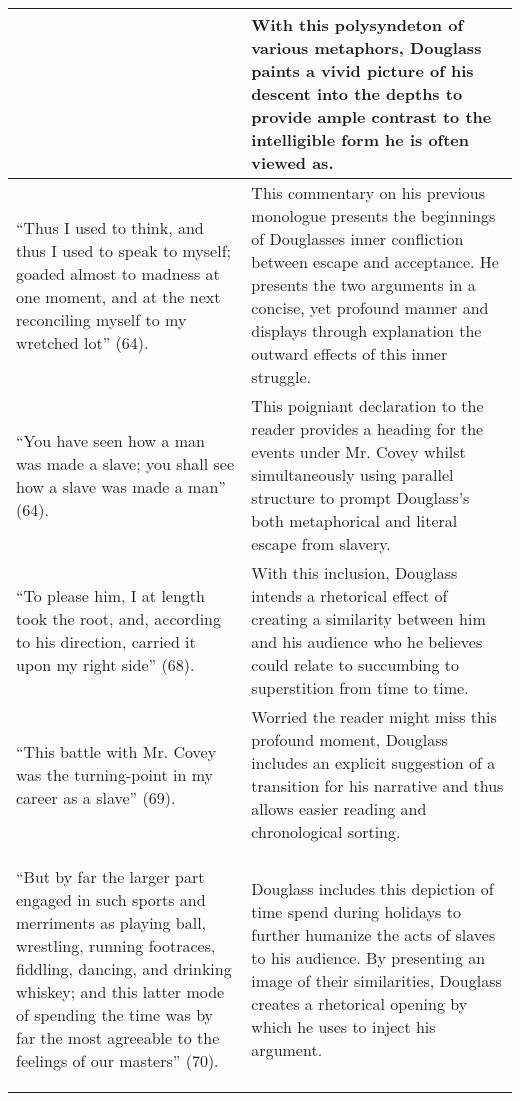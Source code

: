 \documentclass[12pt]{article}
\begin{document}
\begin{longtable}{| p{} | p{} |}
\begin{center}
      \end{center} & With this polysyndeton of various metaphors, Douglass paints a vivid picture of his descent into the depths to provide ample contrast to the intelligible form he is often viewed as.   \\
  \hline
    \begin{center}
      ``Thus I used to think, and thus I used to speak to myself; goaded almost to madness at one moment, and at the next reconciling myself to my wretched lot'' (64).
    \end{center} & This commentary on his previous monologue presents the beginnings of Douglasses inner confliction between escape and acceptance. He presents the two arguments in a concise, yet profound manner and displays through explanation the outward effects of this inner struggle. \\
  \hline
    \begin{center}
      ``You have seen how a man was made a slave; you shall see how a slave was made a man'' (64).
    \end{center} & This poigniant declaration to the reader provides a heading for the events under Mr. Covey whilst simultaneously using parallel structure to prompt Douglass's both metaphorical and literal escape from slavery.  \\
  \hline
    \begin{center}
      ``To please him, I at length took the root, and, according to his direction, carried it upon my right side'' (68).
    \end{center} & With this inclusion, Douglass intends a rhetorical effect of creating a similarity between him and his audience who he believes could relate to succumbing to superstition from time to time.\\
  \hline
    \begin{center}
      ``This battle with Mr. Covey was the turning-point in my career as a slave'' (69).
    \end{center} & Worried the reader might miss this profound moment, Douglass includes an explicit suggestion of a transition for his narrative and thus allows easier reading and chronological sorting. \\
  \hline
    \begin{center}
      ``But by far the larger part engaged in such sports and merriments as playing ball, wrestling, running footraces, fiddling, dancing, and drinking whiskey; and this latter mode of spending the time was by far the most agreeable to the feelings of our masters'' (70).
    \end{center} & Douglass includes this depiction of time spend during holidays to further humanize the acts of slaves to his audience. By presenting an image of their similarities, Douglass creates a rhetorical opening by which he uses to inject his argument.  \\
  \hline
\end{longtable}
\end{document}
